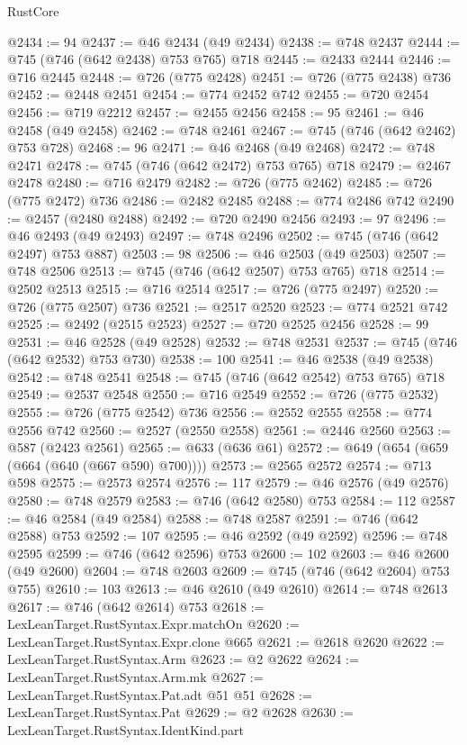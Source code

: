 \begin{lexlean}{RustCore}
\begin{coremodule}
@2434 := 94
@2437 := @46 @2434 (@49 @2434)
@2438 := @748 @2437
@2444 := @745 (@746 (@642 @2438) @753 @765) @718
@2445 := @2433 @2444
@2446 := @716 @2445
@2448 := @726 (@775 @2428)
@2451 := @726 (@775 @2438) @736
@2452 := @2448 @2451
@2454 := @774 @2452 @742
@2455 := @720 @2454
@2456 := @719 @2212
@2457 := @2455 @2456
@2458 := 95
@2461 := @46 @2458 (@49 @2458)
@2462 := @748 @2461
@2467 := @745 (@746 (@642 @2462) @753 @728)
@2468 := 96
@2471 := @46 @2468 (@49 @2468)
@2472 := @748 @2471
@2478 := @745 (@746 (@642 @2472) @753 @765) @718
@2479 := @2467 @2478
@2480 := @716 @2479
@2482 := @726 (@775 @2462)
@2485 := @726 (@775 @2472) @736
@2486 := @2482 @2485
@2488 := @774 @2486 @742
@2490 := @2457 (@2480 @2488)
@2492 := @720 @2490 @2456
@2493 := 97
@2496 := @46 @2493 (@49 @2493)
@2497 := @748 @2496
@2502 := @745 (@746 (@642 @2497) @753 @887)
@2503 := 98
@2506 := @46 @2503 (@49 @2503)
@2507 := @748 @2506
@2513 := @745 (@746 (@642 @2507) @753 @765) @718
@2514 := @2502 @2513
@2515 := @716 @2514
@2517 := @726 (@775 @2497)
@2520 := @726 (@775 @2507) @736
@2521 := @2517 @2520
@2523 := @774 @2521 @742
@2525 := @2492 (@2515 @2523)
@2527 := @720 @2525 @2456
@2528 := 99
@2531 := @46 @2528 (@49 @2528)
@2532 := @748 @2531
@2537 := @745 (@746 (@642 @2532) @753 @730)
@2538 := 100
@2541 := @46 @2538 (@49 @2538)
@2542 := @748 @2541
@2548 := @745 (@746 (@642 @2542) @753 @765) @718
@2549 := @2537 @2548
@2550 := @716 @2549
@2552 := @726 (@775 @2532)
@2555 := @726 (@775 @2542) @736
@2556 := @2552 @2555
@2558 := @774 @2556 @742
@2560 := @2527 (@2550 @2558)
@2561 := @2446 @2560
@2563 := @587 (@2423 @2561)
@2565 := @633 (@636 @61)
@2572 := @649 (@654 (@659 (@664 (@640 (@667 @590) @700))))
@2573 := @2565 @2572
@2574 := @713 @598
@2575 := @2573 @2574
@2576 := 117
@2579 := @46 @2576 (@49 @2576)
@2580 := @748 @2579
@2583 := @746 (@642 @2580) @753
@2584 := 112
@2587 := @46 @2584 (@49 @2584)
@2588 := @748 @2587
@2591 := @746 (@642 @2588) @753
@2592 := 107
@2595 := @46 @2592 (@49 @2592)
@2596 := @748 @2595
@2599 := @746 (@642 @2596) @753
@2600 := 102
@2603 := @46 @2600 (@49 @2600)
@2604 := @748 @2603
@2609 := @745 (@746 (@642 @2604) @753 @755)
@2610 := 103
@2613 := @46 @2610 (@49 @2610)
@2614 := @748 @2613
@2617 := @746 (@642 @2614) @753
@2618 := LexLeanTarget.RustSyntax.Expr.matchOn
@2620 := LexLeanTarget.RustSyntax.Expr.clone @665
@2621 := @2618 @2620
@2622 := LexLeanTarget.RustSyntax.Arm
@2623 := @2 @2622
@2624 := LexLeanTarget.RustSyntax.Arm.mk
@2627 := LexLeanTarget.RustSyntax.Pat.adt @51 @51
@2628 := LexLeanTarget.RustSyntax.Pat
@2629 := @2 @2628
@2630 := LexLeanTarget.RustSyntax.IdentKind.part

\end{coremodule}
\end{lexlean}
